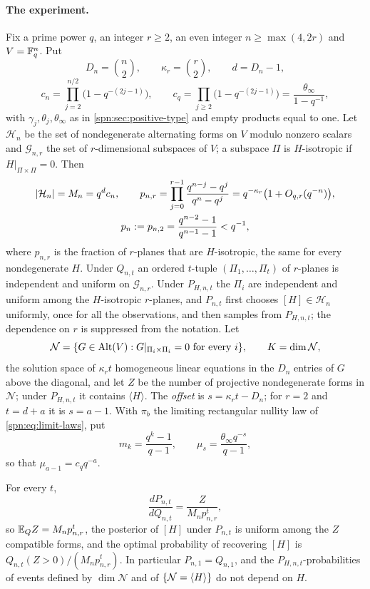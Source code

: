 \paragraph{The experiment.}
Fix a prime power $q$, an integer $r\ge2$, an even integer $n\ge\max(4,2r)$ and $V=\mathbb{F}_q^n$. Put
\[
 D_n=\binom n2,\qquad \kappa_r=\binom r2,\qquad d=D_n-1,
\]
\[
 c_n=\prod_{j=2}^{n/2}\bigl(1-q^{-(2j-1)}\bigr),\qquad
 c_q=\prod_{j\ge2}\bigl(1-q^{-(2j-1)}\bigr)=\frac{\theta_\infty}{1-q^{-1}},
\]
with $\gamma_j,\theta_j,\theta_\infty$ as in \cref{spn:sec:positive-type} and empty products equal
to one. Let $\mathcal H_n$ be the set of nondegenerate alternating forms on $V$ modulo nonzero
scalars and $\mathcal G_{n,r}$ the set of $r$-dimensional subspaces of $V$; a subspace $\Pi$ is
$H$-isotropic if $H|_{\Pi\times\Pi}=0$. Then
\begin{equation}\label{spn:eq:hidden-counts}
\begin{gathered}
 \lvert\mathcal H_n\rvert=M_n=q^dc_n,\qquad
 p_{n,r}=\prod_{j=0}^{r-1}\frac{q^{n-j}-q^j}{q^n-q^j}=q^{-\kappa_r}\bigl(1+O_{q,r}(q^{-n})\bigr),\\
 p_n:=p_{n,2}=\frac{q^{n-2}-1}{q^{n-1}-1}<q^{-1},
\end{gathered}
\end{equation}
where $p_{n,r}$ is the fraction of $r$-planes that are $H$-isotropic, the same for every
nondegenerate $H$. Under $Q_{n,t}$ an ordered $t$-tuple $(\Pi_1,\dots,\Pi_t)$ of $r$-planes is
independent and uniform on $\mathcal G_{n,r}$. Under $P_{H,n,t}$ the $\Pi_i$ are independent and
uniform among the $H$-isotropic $r$-planes, and $P_{n,t}$ first chooses $[H]\in\mathcal H_n$
uniformly, once for all the observations, and then samples from $P_{H,n,t}$; the dependence on $r$
is suppressed from the notation. Let
\[
 \mathcal N=\{G\in\operatorname{Alt}(V):G|_{\Pi_i\times\Pi_i}=0\text{ for every }i\},\qquad K=\dim\mathcal N,
\]
the solution space of $\kappa_rt$ homogeneous linear equations in the $D_n$ entries of $G$ above
the diagonal, and let $Z$ be the number of projective nondegenerate forms in $\mathcal N$; under
$P_{H,n,t}$ it contains $\langle H\rangle$. The \emph{offset} is $s=\kappa_rt-D_n$; for $r=2$ and
$t=d+a$ it is $s=a-1$. With $\pi_b$ the limiting rectangular nullity law of
\eqref{spn:eq:limit-laws}, put
\[
 m_k=\frac{q^k-1}{q-1},\qquad \mu_s=\frac{\theta_\infty q^{-s}}{q-1},
\]
so that $\mu_{a-1}=c_qq^{-a}$.

\begin{lemma}\label{spn:lem:hidden-likelihood}
For every $t$,
\begin{equation}\label{spn:eq:hidden-likelihood}
 \frac{dP_{n,t}}{dQ_{n,t}}=\frac{Z}{M_np_{n,r}^t},
\end{equation}
so $\mathbb{E}_QZ=M_np_{n,r}^t$, the posterior of $[H]$ under $P_{n,t}$ is uniform among the $Z$
compatible forms, and the optimal probability of recovering $[H]$ is
$Q_{n,t}(Z>0)/(M_np_{n,r}^t)$. In particular $P_{n,1}=Q_{n,1}$, and the
$P_{H,n,t}$-probabilities of events defined by $\dim\mathcal N$ and of $\{\mathcal N=\langle
H\rangle\}$ do not depend on $H$.
\end{lemma}

